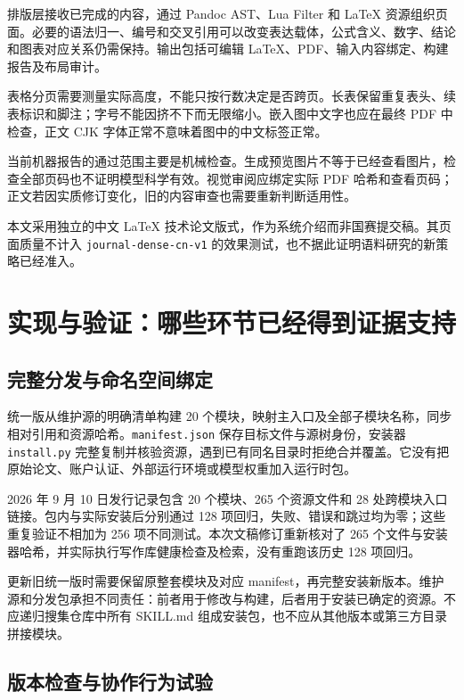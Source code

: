 \documentclass[UTF8,a4paper,zihao=-4,fontset=fandol]{ctexart}
\newcommand{\code}[1]{\texttt{\small #1}}
\begin{document}
排版层接收已完成的内容，通过 Pandoc AST、Lua Filter 和 LaTeX 资源组织页面。必要的语法归一、编号和交叉引用可以改变表达载体，公式含义、数字、结论和图表对应关系仍需保持。输出包括可编辑 LaTeX、PDF、输入内容绑定、构建报告及布局审计。

表格分页需要测量实际高度，不能只按行数决定是否跨页。长表保留重复表头、续表标识和脚注；字号不能因挤不下而无限缩小。嵌入图中文字也应在最终 PDF 中检查，正文 CJK 字体正常不意味着图中的中文标签正常。

当前机器报告的通过范围主要是机械检查。生成预览图片不等于已经查看图片，检查全部页码也不证明模型科学有效。视觉审阅应绑定实际 PDF 哈希和查看页码；正文若因实质修订变化，旧的内容审查也需要重新判断适用性。

本文采用独立的中文 LaTeX 技术论文版式，作为系统介绍而非国赛提交稿。其页面质量不计入 \code{journal-dense-cn-v1} 的效果测试，也不据此证明语料研究的新策略已经准入。

\section{实现与验证：哪些环节已经得到证据支持}

\subsection{完整分发与命名空间绑定}

统一版从维护源的明确清单构建 20 个模块，映射主入口及全部子模块名称，同步相对引用和资源哈希。\code{manifest.json} 保存目标文件与源树身份，安装器 \code{install.py} 完整复制并核验资源，遇到已有同名目录时拒绝合并覆盖。它没有把原始论文、账户认证、外部运行环境或模型权重加入运行时包。

2026 年 9 月 10 日发行记录包含 20 个模块、265 个资源文件和 28 处跨模块入口链接。包内与实际安装后分别通过 128 项回归，失败、错误和跳过均为零；这些重复验证不相加为 256 项不同测试\cite{install,checks}。本次文稿修订重新核对了 265 个文件与安装器哈希，并实际执行写作库健康检查及检索，没有重跑该历史 128 项回归。

更新旧统一版时需要保留原整套模块及对应 manifest，再完整安装新版本。维护源和分发包承担不同责任：前者用于修改与构建，后者用于安装已确定的资源。不应递归搜集仓库中所有 SKILL.md 组成安装包，也不应从其他版本或第三方目录拼接模块。

\subsection{版本检查与协作行为试验}
\end{document}
